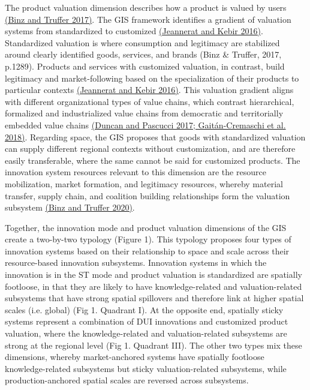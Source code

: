 \documentclass[twoside,12pt,final]{ucthesis-CA2012}
\begin{document}
\begin{ucmainmatter}
The product valuation dimension describes how a product is valued by
users \href{https://www.zotero.org/google-docs/?WdhxCQ}{(Binz and Truffer
2017)}. The GIS framework
identifies a gradient of valuation systems from standardized to
customized \href{https://www.zotero.org/google-docs/?Nm2Lhv}{(Jeannerat and Kebir
2016)}. Standardized
valuation is where \textquotesingle consumption and legitimacy are stabilized around
clearly identified goods, services, and brands\textquotesingle{} (Binz \& Truffer, 2017,
p.1289). Products and services with customized valuation, in contrast,
build legitimacy and market-following based on the specialization of
their products to particular contexts \href{https://www.zotero.org/google-docs/?gTPKm2}{(Jeannerat and Kebir
2016)}. This valuation
gradient aligns with different organizational types of value chains,
which contrast hierarchical, formalized and industrialized value chains
from democratic and territorially embedded value chains \href{https://www.zotero.org/google-docs/?UQzBFq}{(Duncan and
Pascucci 2017; Gaitán-Cremaschi et al.
2018)}. Regarding space, the
GIS proposes that goods with standardized valuation can supply different
regional contexts without customization, and are therefore easily
transferable, where the same cannot be said for customized products. The
innovation system resources relevant to this dimension are the resource
mobilization, market formation, and legitimacy resources, whereby
material transfer, supply chain, and coalition building relationships
form the \textquotesingle valuation subsystem\textquotesingle{} \href{https://www.zotero.org/google-docs/?7zOOi5}{(Binz and Truffer
2020)}.

Together, the innovation mode and product valuation dimensions of the
GIS create a two-by-two typology (Figure 1). This typology proposes four
types of innovation systems based on their relationship to space and
scale across their resource-based innovation subsystems. Innovation
systems in which the innovation is in the ST mode and product valuation
is standardized are \textquotesingle spatially footloose\textquotesingle, in that they are likely to
have knowledge-related and valuation-related subsystems that have strong
spatial spillovers and therefore link at higher spatial scales (i.e.
\textquotesingle global\textquotesingle) (Fig 1. Quadrant I). At the opposite end, \textquotesingle spatially
sticky\textquotesingle{} systems represent a combination of DUI innovations and
customized product valuation, where the knowledge-related and
valuation-related subsystems are strong at the regional level (Fig 1.
Quadrant III). The other two types mix these dimensions, whereby
\textquotesingle market-anchored\textquotesingle{} systems have spatially footloose knowledge-related
subsystems but sticky valuation-related subsystems, while
\textquotesingle production-anchored\textquotesingle{} spatial scales are reversed across subsystems.


\end{ucmainmatter}
\end{document}
